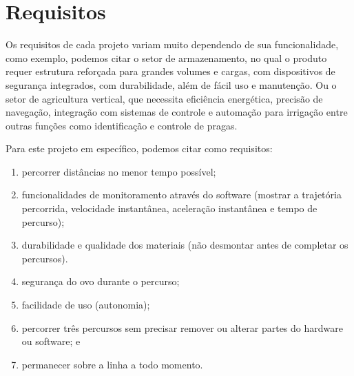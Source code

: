 \section{Requisitos}

Os requisitos de cada projeto variam muito dependendo de sua funcionalidade,
como exemplo, podemos citar o setor de armazenamento, no qual o produto requer
estrutura reforçada para grandes volumes e cargas, com dispositivos de segurança
integrados, com durabilidade, além de fácil uso e manutenção. Ou o setor de
agricultura vertical, que necessita eficiência energética, precisão de
navegação, integração com sistemas de controle e automação para irrigação entre
outras funções como identificação e controle de pragas.

Para este projeto em específico, podemos citar como requisitos:

%
%
\begin{enumerate}
  \item percorrer distâncias no menor tempo possível;
  \item
    funcionalidades de monitoramento através do software (mostrar a trajetória
    percorrida, velocidade instantânea, aceleração instantânea e tempo de
    percurso);
  \item
    durabilidade e qualidade dos materiais (não desmontar antes de completar os
    percursos).
  \item segurança do ovo durante o percurso;
  \item facilidade de uso (autonomia);
  \item
    percorrer três percursos sem precisar remover ou alterar partes do hardware
    ou software; e
  \item permanecer sobre a linha a todo momento.
\end{enumerate}
